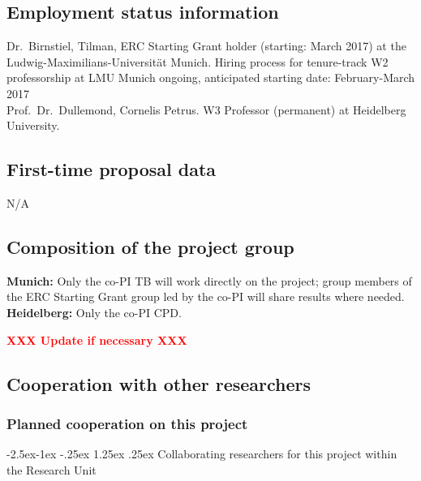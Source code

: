 \documentclass[10pt,fleqn,twoside]{article}
\makeatletter
\newcommand{\missing}[1]{\textcolor{red}{\textbf{XXX #1 XXX}}}
\newcommand{\Tcol}{\color{blue}}
\renewcommand\paragraph{\@startsection{paragraph}{4}{\z@}%
            {-2.5ex\@plus -1ex \@minus -.25ex}%
            {1.25ex \@plus .25ex}%
            {\normalfont\normalsize\bfseries}}
\makeatother
\begin{document}
\subsection{Employment status information}


Dr.~Birnstiel, Tilman, ERC Starting Grant holder (starting: March 2017) at
the Ludwig-Maximilians-Universit\"at Munich. Hiring process for tenure-track W2
professorship at LMU Munich ongoing, anticipated starting date: February-March
2017\\
Prof.~Dr.~Dullemond, Cornelis Petrus.
W3 Professor (permanent) at Heidelberg University.


\subsection{First-time proposal data}

N/A

\subsection{Composition of the project group}
\textbf{Munich:} Only the co-PI TB will work directly on the project; group
members of the ERC Starting Grant group led by the co-PI will share results where
needed.\\
\textbf{Heidelberg:} Only the co-PI CPD.

\missing{Update if necessary}

\subsection{Cooperation with other researchers}

\subsubsection{Planned cooperation on this project}

\paragraph{\Tcol Collaborating researchers for this project within the
  Research Unit}
\end{document}
